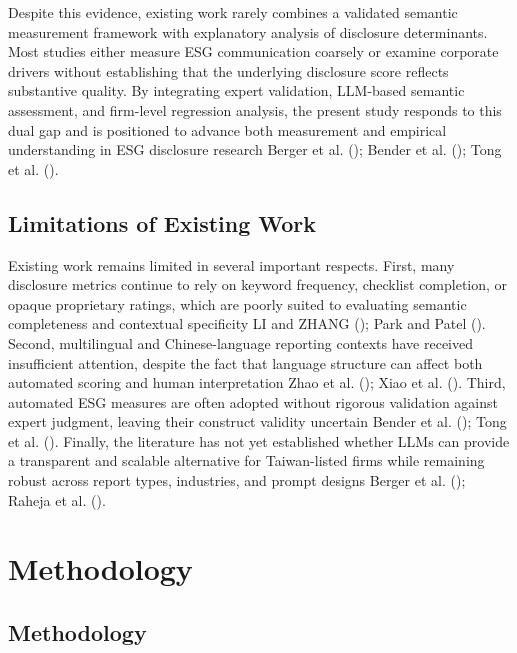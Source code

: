 \documentclass[
  12pt,
]{article}
\begin{document}
Despite this evidence, existing work rarely combines a validated
semantic measurement framework with explanatory analysis of disclosure
determinants. Most studies either measure ESG communication coarsely or
examine corporate drivers without establishing that the underlying
disclosure score reflects substantive quality. By integrating expert
validation, LLM-based semantic assessment, and firm-level regression
analysis, the present study responds to this dual gap and is positioned
to advance both measurement and empirical understanding in ESG
disclosure research Berger et al. ();
Bender et al. (); Tong et al.
().

\subsection{Limitations of Existing
Work}\label{limitations-of-existing-work}

Existing work remains limited in several important respects. First, many
disclosure metrics continue to rely on keyword frequency, checklist
completion, or opaque proprietary ratings, which are poorly suited to
evaluating semantic completeness and contextual specificity LI and ZHANG
(); Park and Patel
(). Second, multilingual and
Chinese-language reporting contexts have received insufficient
attention, despite the fact that language structure can affect both
automated scoring and human interpretation Zhao et al.
(); Xiao et al.
(). Third, automated ESG measures are often
adopted without rigorous validation against expert judgment, leaving
their construct validity uncertain Bender et al.
(); Tong et al.
(). Finally, the literature has not yet
established whether LLMs can provide a transparent and scalable
alternative for Taiwan-listed firms while remaining robust across report
types, industries, and prompt designs Berger et al.
(); Raheja et al.
().

\section{Methodology}\label{methodology}

\subsection{Methodology}\label{methodology-1}
\end{document}

